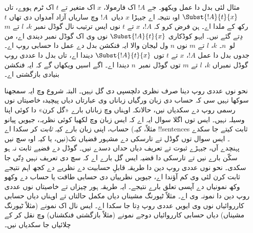 \documentclass[../../../include/open-logic-section]{subfiles}
\begin{document}
مثال لئی بدل دا عمل ویکھو۔ جے $!A$ اک فارمولا، $x$ اک متغیر
تے $t$ اک ٹرم ہووے، تاں $\Subst{!A}{t}{x}$ اوہ نتیجہ اے جیہڑا
$x$ دیاں~$!A$ وچ ساریاں آزاد آمدواں دی تھاں $t$ رکھ کے ملدا اے۔
ہن فرض کرو کہ $!A$، $x$ تے $t$ نوں ایس ترتیب نال گوڈل نمبر
$k$، $l$ تے $m$ دِتے گئے نیں۔ ایہو کوڈکاری $\Subst{!A}{t}{x}$
نوں وی اک گوڈل نمبر دیندی اے، من لو~$n$۔ $k$، $l$ تے $m$ نوں
$n$ ول لیجان والا ایہ فنکشن بدل دے عمل دا حسابی روپ اے۔ جدوں
بدل دا عمل $!A$، $x$ تے $t$ توں $\Subst{!A}{t}{x}$ دیندا اے،
تاں بدل دا عددی روپ گوڈل نمبراں $k$، $l$ تے $m$ توں گوڈل
نمبر~$n$ دیندا اے۔ اگے اسیں ویکھاں گے کہ ایہ فنکشن بنیادی
بازگشتی اے۔

نحو نوں عددی روپ دینا صرف نظری دلچسپی دی گل نہیں۔ البتہ شروع
وچ ایہ سمجھنا سوکھا نہیں سی کہ حساب دی زبان ورگیاں زباناں وی
عبارتاں دیاں پیچیدہ خاصیتاں نوں رسمی روپ دے سکدیاں نیں، حالانکہ
اوہناں وچ زباناں بارے «گل کرن» دا کوئی اپنا وسیلہ نہیں۔ ایس توں
اگلا سوال ایہ اے کہ ایس زبان وچ لکھیا کوئی نظریہ، جیویں پیانو
حساب، اپنی زبان بارے کیہ \emph{ثابت} کر سکدا اے (مثلاً، کیہ
!!{sentence}s ثابت کیتے جا سکدے نیں، یا کیہ اوہ سچ نیں)۔ ایس
سوال توں گوڈل تے تارسکی دے مشہور قضیاں تک پہنچدے آں، جیہڑے
ثبوت تے تعریف دیاں حداں دسدے نیں۔ گوڈل دے قضیے ثابت نہ ہو
سکّن بارے نیں تے تارسکی دا قضیہ ایس گل بارے اے کہ سچ دی تعریف
نہیں دِتّی جا سکدی۔ نحو نوں عددی روپ دین دا طریقہ قابلِ حسابیت
دے نظریے دے کجھ اہم نتیجے ثابت کرن لئی وی کم آؤندا اے، جیویں
نظرییاں دی حسابی طاقت یا حساب دے وکھو وکھ نمونیاں دے آپسی تعلق
بارے نتیجے۔ ایہ طریقہ ہور چیزاں تے خاصیتاں نوں عددی روپ دین دا
نمونہ وی اے۔ مثلاً ٹیورنگ مشیناں دیاں مکمل حالتاں تے اوہناں
دیاں حسابی کارروائیاں نوں وی ایویں عددی روپ دِتا جا سکدا اے۔
ایس نال اک نمونے (مثلاً ٹیورنگ مشیناں) دیاں حسابی کارروائیاں
دوجے نمونے (مثلاً بازگشتی فنکشناں) وچ نقل کر کے چلائیاں جا
سکدیاں نیں۔
\end{document}
